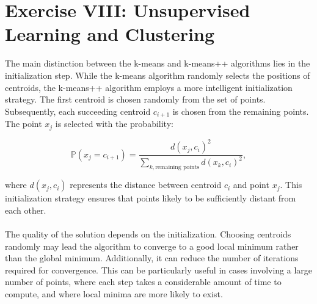 \section{Exercise VIII: Unsupervised Learning and Clustering}

The main distinction between the k-means and k-means++ algorithms lies in the initialization step. While the k-means algorithm randomly selects the positions of centroids, the k-means++ algorithm employs a more intelligent initialization strategy. The first centroid is chosen randomly from the set of points. Subsequently, each succeeding centroid \(c_{i+1}\) is chosen from the remaining points. The point \(x_j\) is selected with the probability:

\[
\mathbb{P}(x_j = c_{i+1}) = \frac{d(x_j, c_i)^2}{\displaystyle \sum_{k, \text{remaining points}} d(x_k, c_i)^2},
\]

where $d(x_j, c_i)$ represents the distance between centroid \(c_i\) and point \(x_j\). This initialization strategy ensures that points likely to be sufficiently distant from each other.\\ \\
The quality of the solution depends on the initialization. Choosing centroids randomly may lead the algorithm to converge to a good local minimum rather than the global minimum. Additionally, it can reduce the number of iterations required for convergence. This can be particularly useful in cases involving a large number of points, where each step takes a considerable amount of time to compute, and where local minima are more likely to exist.